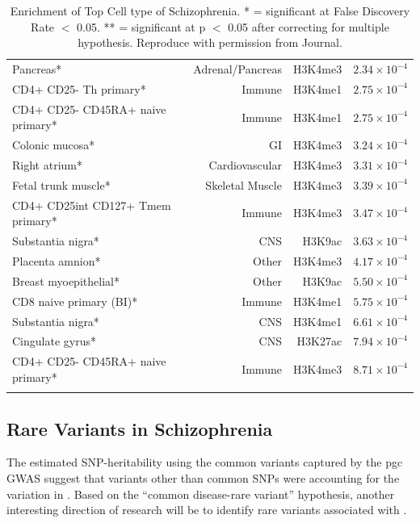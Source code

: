 \begin{singlespace}
\begin{longtable}{p{6cm}rrr}
			Pancreas* & Adrenal/Pancreas & H3K4me3 & $2.34\times 10^{-4}$ \\
			CD4+ CD25- Th primary* & Immune & H3K4me1 & $2.75\times 10^{-4}$ \\
			CD4+ CD25- CD45RA+ naive primary* & Immune & H3K4me1 & $2.75\times 10^{-4}$\\
			Colonic mucosa* & GI    & H3K4me3 & $3.24\times 10^{-4}$ \\
			Right atrium* & Cardiovascular & H3K4me3 & $3.31\times 10^{-4}$ \\
			Fetal trunk muscle* & Skeletal Muscle & H3K4me3 & $3.39\times 10^{-4}$ \\
			CD4+ CD25int CD127+ Tmem primary* & Immune & H3K4me3 & $3.47\times 10^{-4}$ \\
			Substantia nigra* & CNS   & H3K9ac & $3.63\times 10^{-4}$ \\
			Placenta amnion* & Other & H3K4me3 & $4.17\times 10^{-4}$ \\
			Breast myoepithelial* & Other & H3K9ac & $5.50\times 10^{-4}$ \\
			CD8 naive primary (BI)* & Immune & H3K4me1 & $5.75\times 10^{-4}$ \\
			Substantia nigra* & CNS   & H3K4me1 & $6.61\times 10^{-4}$ \\
			Cingulate gyrus* & CNS   & H3K27ac & $7.94\times 10^{-4}$ \\
			CD4+ CD25- CD45RA+ naive primary* & Immune & H3K4me3 & $8.71\times 10^{-4}$ \\
			\bottomrule
			\caption[Enrichment of Top Cell Type of Schizophrenia]{Enrichment of Top Cell type of Schizophrenia.
				* = significant at False Discovery Rate $<$ 0.05.
				** = significant at p $<$ 0.05 after correcting for multiple hypothesis. 
				Reproduce with permission from Journal.\citep{Finucane2015}}
			\label{tab:cellTypeScz}%
		\end{longtable}%
	\end{singlespace}
		
	\subsection{Rare Variants in Schizophrenia}
	The estimated \gls{SNP}-heritability using the common variants captured by the \gls{pgc}  \gls{GWAS} suggest that variants other than common \glspl{SNP} were accounting for the variation in .
	Based on the ``common disease-rare variant'' hypothesis, another interesting direction of  research will be to identify rare variants associated with .
	
